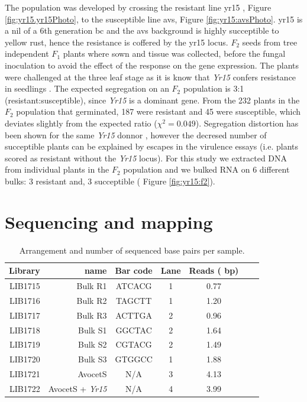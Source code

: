 The population was developed by crossing the resistant line \gls{yr15} \citep{Wellings1998}, Figure \ref{fig:yr15.yr15Photo}, to the susceptible line \gls{avs}, Figure \ref{fig:yr15:avsPhoto}. 
\acrshort{yr15} is a \gls{nil} of a 6th generation \gls{bc} and the \acrshort{avs} background is highly succeptible to yellow rust, hence the resistance is coffered by the \acrshort{yr15} locus. 
$F_{2}$ seeds from tree independent $F_{1}$ plants where sown and tissue was collected, before the fungal inoculation to avoid the effect of the response on the gene expression.  
The plants were challenged at the three leaf stage as it is know that \textit{Yr15} confers resistance in seedlings \citep{Gerechter-Amitai1989}.
The expected segregation on an $F_{2}$ population is 3:1 (resistant:susceptible), since \textit{Yr15} is a dominant gene.
From the 232 plants in the $F_{2}$ population that germinated, 187 were resistant and 45 were susceptible, which deviates slightly from the expected ratio ($\chi^{2}=0.049$).
Segregation distortion has been shown for the same \textit{Yr15} donnor \citep{Randhawa2009}, however the decresed number of succeptible plants can be explained by escapes in the virulence essays (i.e. plants scored as resistant without the \textit{Yr15} locus).   For this study we extracted DNA from individual plants in the $F_{2}$ population and we bulked RNA on 6 different bulks: 3 resistant and, 3 succeptible ( Figure \ref{fig:yr15:f2}). 

\section{Sequencing and mapping} 

\begin{table}
\centering
\caption{Arrangement and number of sequenced base pairs per sample. }
\label{tab:yr15:reads}
\begin{tabular}{rrccccc}
\toprule
Library & name & Bar code & Lane   &  Reads (\e{8} bp)\\ 
\midrule
LIB1715 & Bulk R1 & ATCACG & 1 	& 0.77\\
LIB1716 & Bulk R2 & TAGCTT & 1 		& 1.20\\
LIB1717 & Bulk R3 & ACTTGA & 2 	& 0.96  \\ 
LIB1718 & Bulk S1 & GGCTAC & 2 	& 1.64   \\ 
LIB1719 & Bulk S2 & CGTACG & 2 	& 1.49  \\ 
LIB1720 & Bulk S3 & GTGGCC & 1 	&1.88  \\ 
LIB1721 & AvocetS & N/A & 3 		& 4.13 \\ 
LIB1722 & AvocetS + \textit{Yr15} & N/A & 4 	& 3.99  \\ 
\bottomrule
\end{tabular}
\end{table}


